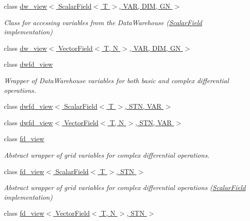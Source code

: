 \begin{DoxyCompactItemize}
class \hyperlink{classUintah_1_1PhaseField_1_1detail_1_1dw__view_3_01ScalarField_3_01T_01_4_00_01VAR_00_01DIM_00_01GN_01_4}{dw\+\_\+view$<$ Scalar\+Field$<$ T $>$, V\+A\+R, D\+I\+M, G\+N $>$}
\begin{DoxyCompactList}\small\item\em Class for accessing variables from the Data\+Warehouse (\hyperlink{structUintah_1_1PhaseField_1_1ScalarField}{Scalar\+Field} implementation) \end{DoxyCompactList}\item 
class \hyperlink{classUintah_1_1PhaseField_1_1detail_1_1dw__view_3_01VectorField_3_01T_00_01N_01_4_00_01VAR_00_01DIM_00_01GN_01_4}{dw\+\_\+view$<$ Vector\+Field$<$ T, N $>$, V\+A\+R, D\+I\+M, G\+N $>$}
\item 
class \hyperlink{classUintah_1_1PhaseField_1_1detail_1_1dwfd__view}{dwfd\+\_\+view}
\begin{DoxyCompactList}\small\item\em Wrapper of Data\+Warehouse variables for both basic and complex differential operations. \end{DoxyCompactList}\item 
class \hyperlink{classUintah_1_1PhaseField_1_1detail_1_1dwfd__view_3_01ScalarField_3_01T_01_4_00_01STN_00_01VAR_01_4}{dwfd\+\_\+view$<$ Scalar\+Field$<$ T $>$, S\+T\+N, V\+A\+R $>$}
\item 
class \hyperlink{classUintah_1_1PhaseField_1_1detail_1_1dwfd__view_3_01VectorField_3_01T_00_01N_01_4_00_01STN_00_01VAR_01_4}{dwfd\+\_\+view$<$ Vector\+Field$<$ T, N $>$, S\+T\+N, V\+A\+R $>$}
\item 
class \hyperlink{classUintah_1_1PhaseField_1_1detail_1_1fd__view}{fd\+\_\+view}
\begin{DoxyCompactList}\small\item\em Abstract wrapper of grid variables for complex differential operations. \end{DoxyCompactList}\item 
class \hyperlink{classUintah_1_1PhaseField_1_1detail_1_1fd__view_3_01ScalarField_3_01T_01_4_00_01STN_01_4}{fd\+\_\+view$<$ Scalar\+Field$<$ T $>$, S\+T\+N $>$}
\begin{DoxyCompactList}\small\item\em Abstract wrapper of grid variables for complex differential operations (\hyperlink{structUintah_1_1PhaseField_1_1ScalarField}{Scalar\+Field} implementation) \end{DoxyCompactList}\item 
class \hyperlink{classUintah_1_1PhaseField_1_1detail_1_1fd__view_3_01VectorField_3_01T_00_01N_01_4_00_01STN_01_4}{fd\+\_\+view$<$ Vector\+Field$<$ T, N $>$, S\+T\+N $>$}

\end{DoxyCompactItemize}
